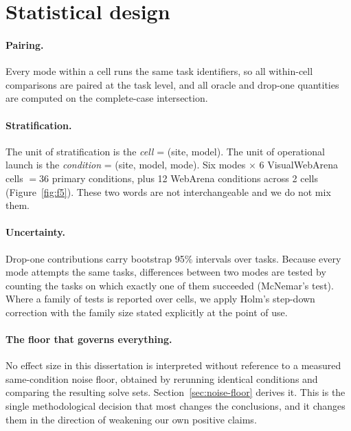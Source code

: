 \FloatBarrier
\section{Statistical design}
\label{sec:stats}

\paragraph{Pairing.} Every mode within a cell runs the same task identifiers, so
all within-cell comparisons are paired at the task level, and all oracle and
drop-one quantities are computed on the complete-case intersection.

\paragraph{Stratification.} The unit of stratification is the \emph{cell} =
(site, model). The unit of operational launch is the \emph{condition} = (site,
model, mode). Six modes $\times$ 6 VisualWebArena cells $=36$ primary
conditions, plus 12 WebArena conditions across 2 cells
(Figure~\ref{fig:f5}). These two words are not interchangeable and we do not mix
them.

\paragraph{Uncertainty.} Drop-one contributions carry bootstrap 95\%
intervals over tasks. Because every mode attempts the same tasks, differences
between two modes are tested by counting the tasks on which exactly one of
them succeeded (McNemar's test). Where a family of tests is reported over cells, we apply Holm's
step-down correction \citep{holm1979} with the family size stated explicitly at
the point of use.

\paragraph{The floor that governs everything.} No effect size in this
dissertation is interpreted without reference to a measured same-condition
noise floor, obtained by rerunning identical conditions and comparing the
resulting solve sets. Section~\ref{sec:noise-floor} derives it. This is the
single methodological decision that most changes the conclusions, and it changes
them in the direction of weakening our own positive claims.

